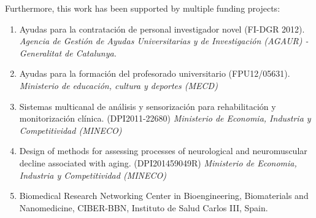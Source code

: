 Furthermore, this work has been supported by multiple funding projects:

\begin{enumerate}
\item Ayudas para la contratación de personal investigador novel (FI-DGR 2012). \emph{Agencia de Gestión de Ayudas Universitarias y de Investigación (AGAUR) - Generalitat de Catalunya.}

\item	Ayudas para la formación del profesorado universitario (FPU12/05631). \emph{Ministerio de educación, cultura y deportes (MECD)}

\item 	Sistemas multicanal de análisis y sensorización para rehabilitación y monitorización clínica. (DPI2011-22680) \emph{Ministerio de Economia, Industria y Competitividad (MINECO)}

\item 	Design of methods for assessing processes of neurological and neuromuscular decline associated with aging. (DPI201459049R) \emph{Ministerio de Economia, Industria y Competitividad (MINECO)}

\item	Biomedical Research Networking Center in Bioengineering, Biomaterials and Nanomedicine, CIBER-BBN, Instituto de Salud Carlos III, Spain.

\end{enumerate}
